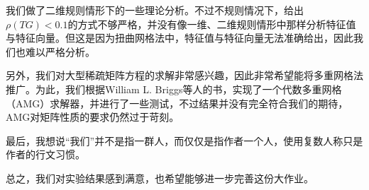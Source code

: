 \documentclass[lang=cn,10pt]{elegantbook}
\begin{document}
我们做了二维规则情形下的一些理论分析。不过不规则情况下，给出$\rho(TG)<0.1$的方式不够严格，并没有像一维、二维规则情形中那样分析特征值与特征向量。但这是因为扭曲网格法中，特征值与特征向量无法准确给出，因此我们也难以严格分析。

另外，我们对大型稀疏矩阵方程的求解非常感兴趣，因此非常希望能将多重网格法推广。为此，我们根据William L. Briggs等人的书，实现了一个代数多重网格（AMG）求解器，并进行了一些测试，不过结果并没有完全符合我们的期待，AMG对矩阵性质的要求仍然过于苛刻。

最后，我想说“我们”并不是指一群人，而仅仅是指作者一个人，使用复数人称只是作者的行文习惯。

总之，我们对实验结果感到满意，也希望能够进一步完善这份大作业。
\end{document}
